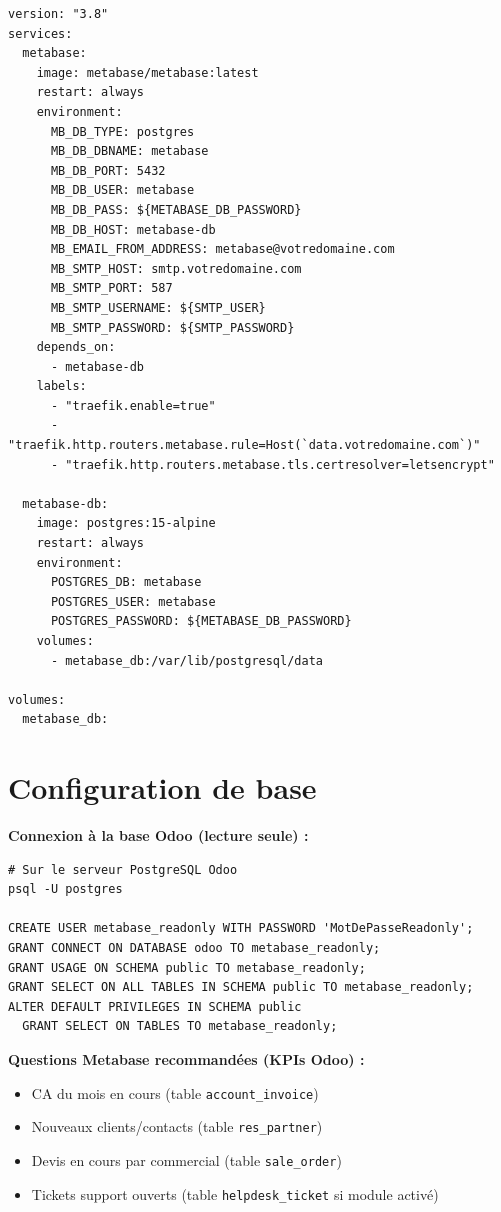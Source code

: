 \documentclass[11pt, a4paper]{article}
\begin{document}
\begin{lstlisting}[style=yamlstyle, caption={docker-compose.yml — Metabase}]
version: "3.8"
services:
  metabase:
    image: metabase/metabase:latest
    restart: always
    environment:
      MB_DB_TYPE: postgres
      MB_DB_DBNAME: metabase
      MB_DB_PORT: 5432
      MB_DB_USER: metabase
      MB_DB_PASS: ${METABASE_DB_PASSWORD}
      MB_DB_HOST: metabase-db
      MB_EMAIL_FROM_ADDRESS: metabase@votredomaine.com
      MB_SMTP_HOST: smtp.votredomaine.com
      MB_SMTP_PORT: 587
      MB_SMTP_USERNAME: ${SMTP_USER}
      MB_SMTP_PASSWORD: ${SMTP_PASSWORD}
    depends_on:
      - metabase-db
    labels:
      - "traefik.enable=true"
      - "traefik.http.routers.metabase.rule=Host(`data.votredomaine.com`)"
      - "traefik.http.routers.metabase.tls.certresolver=letsencrypt"

  metabase-db:
    image: postgres:15-alpine
    restart: always
    environment:
      POSTGRES_DB: metabase
      POSTGRES_USER: metabase
      POSTGRES_PASSWORD: ${METABASE_DB_PASSWORD}
    volumes:
      - metabase_db:/var/lib/postgresql/data

volumes:
  metabase_db:
\end{lstlisting}

\section{Configuration de base}

\textbf{Connexion à la base Odoo (lecture seule) :}
\begin{lstlisting}[style=terminal, caption={Créer un utilisateur PostgreSQL lecture seule}]
# Sur le serveur PostgreSQL Odoo
psql -U postgres

CREATE USER metabase_readonly WITH PASSWORD 'MotDePasseReadonly';
GRANT CONNECT ON DATABASE odoo TO metabase_readonly;
GRANT USAGE ON SCHEMA public TO metabase_readonly;
GRANT SELECT ON ALL TABLES IN SCHEMA public TO metabase_readonly;
ALTER DEFAULT PRIVILEGES IN SCHEMA public
  GRANT SELECT ON TABLES TO metabase_readonly;
\end{lstlisting}

\textbf{Questions Metabase recommandées (KPIs Odoo) :}
\begin{itemize}
  \item CA du mois en cours (table \texttt{account\_invoice})
  \item Nouveaux clients/contacts (table \texttt{res\_partner})
  \item Devis en cours par commercial (table \texttt{sale\_order})
  \item Tickets support ouverts (table \texttt{helpdesk\_ticket} si module activé)
\end{itemize}
\end{document}
